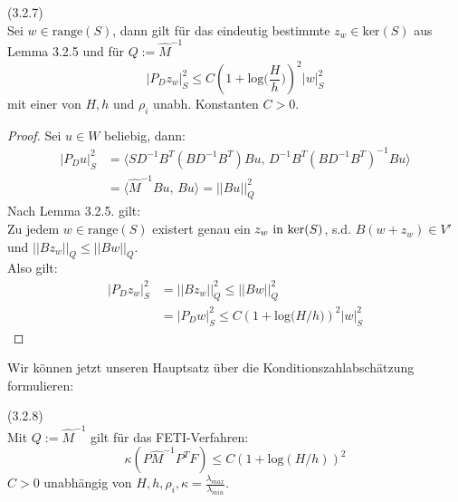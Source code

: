 \begin{lemma} (3.2.7) \\
Sei $w \in \text{range}(S)$, dann gilt für das eindeutig bestimmte $z_w \in \text{ker}(S)$ aus Lemma 3.2.5 und für $Q:= {\hat M}^{-1}$
\[ |P_Dz_w |_S^2 \leq C \left( 1 + \text{log}\big( \frac{H}{h}\big) \right)^2 |w|^2_S \]
mit einer von $H,h$ und $\rho_i$ unabh. Konstanten $C>0$. 
\end{lemma}
\begin{proof}
Sei $u\in W$ beliebig, dann:
\begin{align*}
|P_D u|^2_S &= \langle SD^{-1}B^T (BD^{-1}B^T )Bu,\, D^{-1}B^T (BD^{-1}B^T)^{-1}Bu \rangle \\
		   &= \langle {\hat M}^{-1}Bu,\, Bu \rangle =||Bu||^2_Q
\end{align*}
Nach Lemma 3.2.5. gilt:\\
Zu jedem $w \in \text{range}(S)$ existert genau ein $z_w \textnormal{ in } \text{ker}(S)$, s.d. $B(w+z_w) \in V'$ und $|| Bz_w||_Q \leq ||Bw||_Q$.\\
Also gilt:
\begin{align*}
|P_Dz_w|^2_S &= ||Bz_w||^2_Q \leq || Bw||^2_Q \\
			&= |P_Dw|^2_S \leq C\left(1+ \text{log}\big( H/h\big) \right)^2|w|^2_S
\end{align*}
\end{proof}
Wir können jetzt unseren Hauptsatz über die Konditionszahlabschätzung formulieren:
\begin{satz}(3.2.8)\\
Mit $Q:={\hat M}^{-1}$ gilt für das FETI-Verfahren:
\[ \kappa(P{\hat M}^{-1}P^TF) \leq C(1+\text{log}(H/h))^2 \]
$C>0$ unabhängig von $H,h,\rho_i, \kappa =\frac{\lambda_{max}}{\lambda_{min}}$.
\end{satz}

